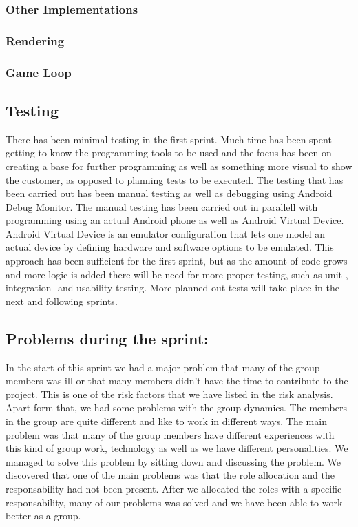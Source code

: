 \subsubsection{Other Implementations}
\subsubsection*{Rendering}
\subsubsection*{Game Loop}

\subsection{Testing}

There has been minimal testing in the first sprint. Much time has been spent getting to know the programming tools to be used and the focus has been on creating a base for further programming as well as something more visual to show the customer, as opposed to planning tests to be executed. The testing that has been carried out has been manual testing as well as debugging using Android Debug Monitor. The manual testing has been carried out in parallell with programming using an actual Android phone as well as Android Virtual Device. Android Virtual Device is an emulator configuration that lets one model an actual device by defining hardware and software options to be emulated. This approach has been sufficient for the first sprint, but as the amount of code grows and more logic is added there will be need for more proper testing, such as unit-, integration- and usability testing. More planned out tests will take place in the next and following sprints.

\subsection{Problems during the sprint:}
In the start of this sprint we had a major problem that many of the group members was ill or 
that many members didn't have the time to contribute to the project. This is one of the risk factors 
that we have listed in the risk analysis. 
Apart form that, we had some problems with the group dynamics. The members in the group are 
quite different and like to work in different ways. The main problem was that many of the group members
have different experiences with this kind of group work, technology as well as we have 
different personalities.
We managed to solve this problem by sitting down and discussing the problem. We discovered that
one of the main problems was that the role allocation and the responsability had not been present.
After we allocated the roles with a specific responsability, many of our problems was solved and
we have been able to work better as a group.

